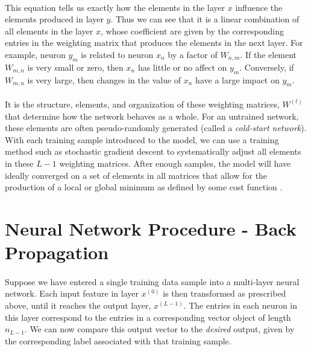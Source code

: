 \documentclass[12pt,letterpaper]{article}
\begin{document}
\paragraph*{}This equation tells us exactly how the elements in the layer $x$ influence the elements produced in layer $y$. Thus we can see that it is a linear combination of all elements in the layer $x$, whose coefficient are given by the corresponding entries in the weighting matrix that produces the elements in the next layer. For example, neuron $y_m$ is related to neuron $x_n$ by a factor of $W_{n,m}$. If the element $W_{m,n}$ is very small or zero, then $x_n$ has little or no affect on $y_m$. Conversely, if $W_{m,n}$ is very large, then changes in the value of $x_n$ have a large impact on $y_m$.
\paragraph*{}It is the structure, elements, and organization of these weighting matrices, $W^{(l)}$ that determine how the network behaves as a whole. For an untrained network, these elements are often pseudo-randomly generated (called a \textit{cold-start network}\cite{Geron}). With each training sample introduced to the model, we can use a training method such as stochastic gradient descent  to systematically adjust all elements in these $L-1$ weighting matrices. After enough samples, the model will have ideally converged on a set of elements in all matrices that allow for the production of a local or global minimum as defined by some cost function \cite{Goodfellow}. 


\section{Neural Network Procedure - Back Propagation}
\paragraph*{}Suppose we have entered a single training data sample into a multi-layer neural network. Each input feature in layer $x^{(0)}$ is then transformed as prescribed above, until it reaches the output layer, $x^{(L-1)}$. The entries in each neuron in this layer correspond to the entries in a corresponding vector object of length $n_{L-1}$. We can now compare this output vector to the \textit{desired} output, given by the corresponding label associated with that training sample.
\end{document}
